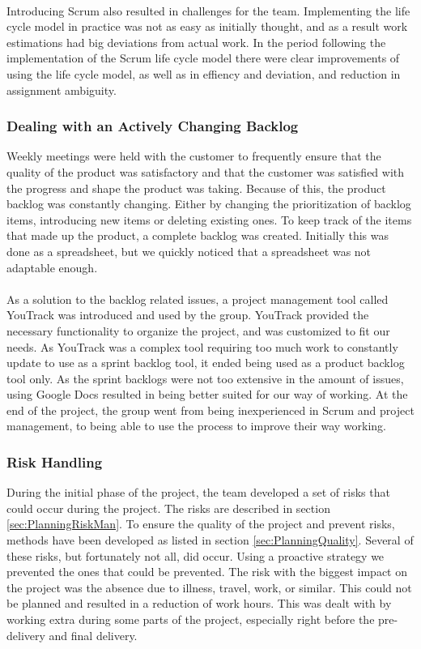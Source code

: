 \paragraph{} Introducing Scrum also resulted in challenges for the team. Implementing the life cycle model in practice was not as easy as initially thought, and as a result work estimations had big deviations from actual work. In the period following the implementation of the Scrum life cycle model there were clear improvements of using the life cycle model, as well as in effiency and deviation, and reduction in assignment ambiguity. 
\subsubsection{Dealing with an Actively Changing Backlog} Weekly meetings were held with the customer to frequently ensure that the quality of the product was satisfactory and that the customer was satisfied with the progress and shape the product was taking. Because of this, the product backlog was constantly changing. Either by changing the prioritization of backlog items, introducing new items or deleting existing ones. To keep track of the items that made up the product, a complete backlog was created. Initially this was done as a spreadsheet, but we quickly noticed that a spreadsheet was not adaptable enough.
\paragraph{} As a solution to the backlog related issues, a project management tool called YouTrack was introduced and used by the group. YouTrack provided the necessary functionality to organize the project, and was customized to fit our needs. As YouTrack was a complex tool requiring too much work to constantly update to use as a sprint backlog tool, it ended being used as a product backlog tool only. As the sprint backlogs were not too extensive in the amount of issues, using Google Docs resulted in being better suited for our way of working. At the end of the project, the group went from being inexperienced in Scrum and project management, to being able to use the process to improve their way working.
\subsubsection{Risk Handling} During the initial phase of the project, the team developed a set of risks that could occur during the project. The risks are described in section \ref{sec:PlanningRiskMan}. To ensure the quality of the project and prevent risks, methods have been developed as listed in section \ref{sec:PlanningQuality}. Several of these risks, but fortunately not all, did occur. Using a proactive strategy we prevented the ones that could be prevented. The risk with the biggest impact on the project was the absence due to illness, travel, work, or similar. This could not be planned and resulted in a reduction of work hours. This was dealt with by working extra during some parts of the project, especially right before the pre-delivery and final delivery. 
